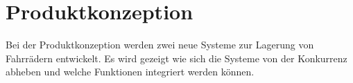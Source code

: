 \section{Produktkonzeption}
Bei der Produktkonzeption werden zwei neue Systeme zur Lagerung von Fahrrädern entwickelt. Es wird gezeigt wie sich die Systeme von der Konkurrenz abheben und welche Funktionen integriert werden können.


\clearpage
